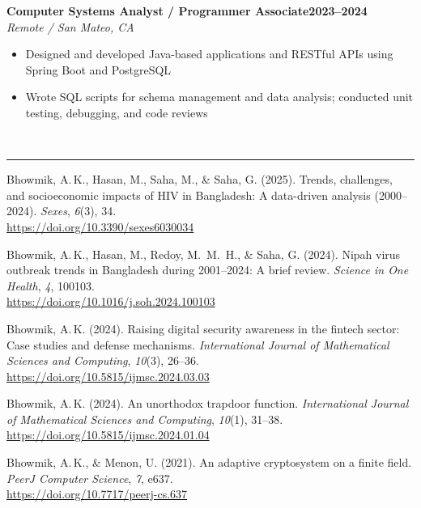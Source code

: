 \documentclass[a4paper, 11pt]{article}
\newcommand{\cvsection}[2]{%
  \vspace{14pt}%
  \noindent#1\enspace{\large\bfseries\MakeUppercase{#2}}\\[-3pt]%
  \rule{\linewidth}{1pt}%
  \vspace{5pt}\par\noindent%
}
\newcommand{\subvspace}{\vspace{6pt}}
\newcommand{\workrole}[3]{%
  \noindent\hspace*{1em}\textbf{#1}\hfill\textbf{#2}\\
  \hspace*{1em}\textit{#3}\par
}
\begin{document}
\subvspace

\begin{minipage}{\linewidth}
\workrole{Computer Systems Analyst / Programmer Associate}%
  {2023--2024}{Remote / San Mateo, CA}
\begin{itemize}
  \item Designed and developed Java-based applications and RESTful APIs using
        Spring Boot and PostgreSQL
  \item Wrote SQL scripts for schema management and data analysis; conducted unit
        testing, debugging, and code reviews
\end{itemize}
\end{minipage}

\cvsection{\faAtom}{Selected Publications}

\begin{enumerate}[label={[\arabic*]}, itemsep=6pt, topsep=3pt]

\item Bhowmik, A.\,K., Hasan, M., Saha, M., \& Saha, G. (2025). Trends, challenges,
  and socioeconomic impacts of HIV in Bangladesh: A data-driven analysis (2000--2024).
  \textit{Sexes}, \textit{6}(3), 34.\\
  \href{https://doi.org/10.3390/sexes6030034}{https://doi.org/10.3390/sexes6030034}

\item Bhowmik, A.\,K., Hasan, M., Redoy, M.\ M.\ H., \& Saha, G. (2024). Nipah virus
  outbreak trends in Bangladesh during 2001--2024: A brief review.
  \textit{Science in One Health}, \textit{4}, 100103.\\
  \href{https://doi.org/10.1016/j.soh.2024.100103}{https://doi.org/10.1016/j.soh.2024.100103}

\item Bhowmik, A.\,K. (2024). Raising digital security awareness in the fintech sector:
  Case studies and defense mechanisms.
  \textit{International Journal of Mathematical Sciences and Computing},
  \textit{10}(3), 26--36.\\
  \href{https://doi.org/10.5815/ijmsc.2024.03.03}{https://doi.org/10.5815/ijmsc.2024.03.03}

\item Bhowmik, A.\,K. (2024). An unorthodox trapdoor function.
  \textit{International Journal of Mathematical Sciences and Computing},
  \textit{10}(1), 31--38.\\
  \href{https://doi.org/10.5815/ijmsc.2024.01.04}{https://doi.org/10.5815/ijmsc.2024.01.04}

\item Bhowmik, A.\,K., \& Menon, U. (2021). An adaptive cryptosystem on a finite field.
  \textit{PeerJ Computer Science}, \textit{7}, e637.\\
  \href{https://doi.org/10.7717/peerj-cs.637}{https://doi.org/10.7717/peerj-cs.637}

\end{enumerate}
\end{document}
